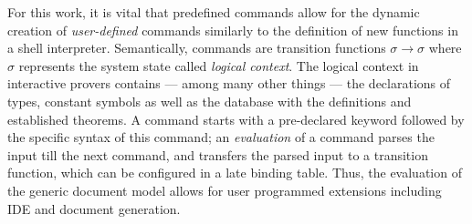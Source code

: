 \begin{isabellebody}
\begin{isamarkuptext}
For this work, it is vital that predefined commands allow for the dynamic creation of
\emph{user-defined} commands similarly to the definition of new functions in a shell
interpreter. Semantically, commands are transition functions $\sigma \rightarrow \sigma$ where
$\sigma$ represents the system state called \emph{logical context}. The logical context in 
interactive provers contains --- among many other things --- the declarations of types, constant
symbols as well as the database with the definitions and established theorems.
A command starts with a pre-declared keyword followed by the specific syntax of this command; an
\emph{evaluation} of a command parses the input till the next command, and transfers
the parsed input to a transition function, which can be configured in a late binding table. Thus,
the evaluation of the generic document model allows for user programmed extensions including IDE and
document generation. 


\end{isamarkuptext}
\end{isabellebody}
